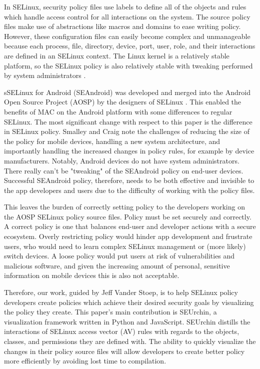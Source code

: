 \documentclass[conference]{IEEEtran}
\begin{document}
In SELinux, security policy files use labels to define all of the objects and rules which handle access control for all interactions on the system. The source policy files make use of abstractions like macros and domains to ease writing policy. However, these configuration files can easily become complex and unmanageable because each process, file, directory, device, port, user, role, and their interactions are defined in an SELinux context. The Linux kernel is a relatively stable platform, so the SELinux policy is also relatively stable with tweaking performed by system administrators \cite{smalley2013security}.

sSELinux for Android (SEAndroid) was developed and merged into the Android Open Source Project (AOSP) \cite{SEAndroidDocs} by the designers of SELinux \cite{smalley2013security,smalley2012security}. This enabled the benefits of MAC on the Android platform with some differences to regular SELinux. The most significant change with respect to this paper is the difference in SELinux policy. Smalley and Craig note the challenges of reducing the size of the policy for mobile devices, handling a new system architecture, and importantly handling the increased changes in policy rules, for example by device manufacturers\cite{smalley2013security}. Notably, Android devices do not have system administrators. There really can't be "tweaking" of the SEAndroid policy on end-user devices. Successful SEAndroid policy, therefore, needs to be both effective and invisible to the app developers and users due to the difficulty of working with the policy files.

This leaves the burden of correctly setting policy to the developers working on the AOSP SELinux policy source files\cite{aospAndroidPolicy}. Policy must be set securely and correctly. A correct policy is one that balances end-user and developer actions with a secure ecosystem. Overly restricting policy would hinder app development and frustrate users, who would need to learn complex SELinux management or (more likely) switch devices. A loose policy would put users at risk of vulnerabilities and malicious software, and given the increasing amount of personal, sensitive information on mobile devices this is also not acceptable.

Therefore, our work, guided by Jeff Vander Stoep, is to help SELinux policy developers create policies which achieve their desired security goals by visualizing the policy they create. This paper's main contribution is SEUrchin, a visualization framework written in Python and JavaScript. SEUrchin distills the interactions of SELinux access vector (AV) rules with regards to the objects, classes, and permissions they are defined with. The ability to quickly visualize the changes in their policy source files will allow developers to create better policy more efficiently by avoiding lost time to compilation.
\end{document}
